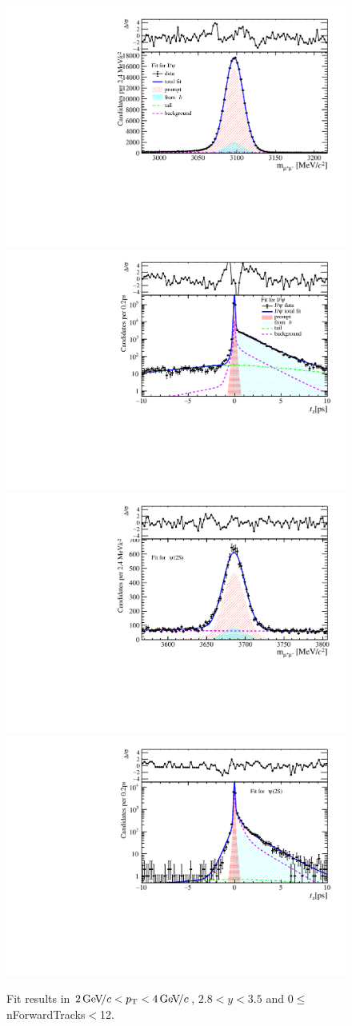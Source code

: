 \begin{figure}[H]
\begin{center}
\includegraphics[width=0.47\linewidth]{pdf/Jpsi/drawmassF/n1y2pt2.pdf}
\includegraphics[width=0.47\linewidth]{pdf/Jpsi/2DFitF/n1y2pt2.pdf}
\vspace*{-0.5cm}
\includegraphics[width=0.47\linewidth]{pdf/Psi2S/drawmassF/n1y2pt2.pdf}
\includegraphics[width=0.47\linewidth]{pdf/Psi2S/2DFitF/n1y2pt2.pdf}
\vspace*{-0.5cm}
\end{center}
\caption{Fit results in $2\text{\,Ge\kern -0.1em V\!/}c<p_{\mathrm{T}}<4\text{\,Ge\kern -0.1em V\!/}c$, $2.8<y<3.5$ and 0$\leq$nForwardTracks$<$12.}
\label{Fitn1y2pt2}
\end{figure}
